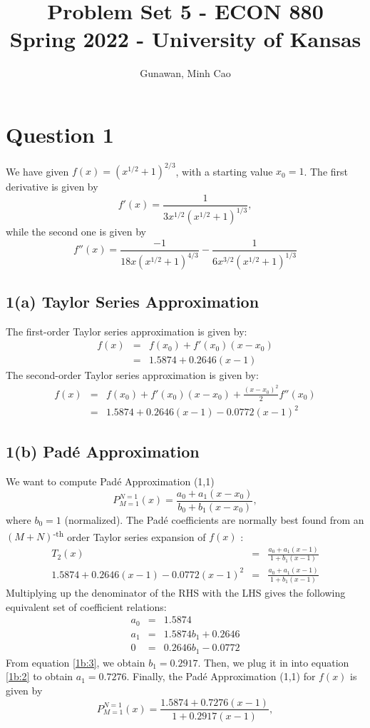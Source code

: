 \documentclass[11pt]{article}
\title{Problem Set 5 - ECON 880\\
	\small Spring 2022 - University of Kansas}
\author{Gunawan, Minh Cao}
\newcommand{\1}{\mathbbm{1}}
\begin{document}
\maketitle	
\section*{Question 1}
We have given $f(x) = (x^{1/2}+1)^{2/3}$, with a starting value $x_0=1$. The first derivative is given by
\[ f'(x) = \frac{1}{3x^{1/2}(x^{1/2} + 1)^{1/3}},\]
while the second one is given by
\[f''(x)= \frac{-1}{18x(x^{1/2} + 1)^{4/3}} - \frac{1}{6x^{3/2}(x^{1/2} + 1)^{1/3}}\]

\subsection*{1(a) Taylor Series Approximation }
The first-order Taylor series approximation is given by:
\begin{eqnarray*}
	f(x) &=& f(x_0)+f'(x_0)(x-x_0)\\
		 &=& 1.5874 + 0.2646 (x-1)
\end{eqnarray*}
The second-order Taylor series approximation is given by:
\begin{eqnarray*}
	f(x) &=& f(x_0)+f'(x_0)(x-x_0)+\frac{(x-x_0)^2}{2}f''(x_0)\\
	&=& 1.5874 + 0.2646 (x-1) -0.0772 (x-1)^2
\end{eqnarray*}
\subsection*{1(b) Pad\'{e} Approximation}
We want to compute Pad\'{e} Approximation (1,1) 
\[P_{M=1}^{N=1}(x) = \frac{a_0+a_1(x-x_0)}{b_0+b_1(x-x_0)},\]
where $b_0=1$ (normalized). 
The Pad\'{e} coefficients are normally best found from an $(M+N)$\textsuperscript{-th} order Taylor series expansion of $f(x)$ :
\begin{eqnarray*}
	T_2(x) &=& \frac{a_0+a_1(x-1)}{1+b_1(x-1)}\\
	1.5874 + 0.2646 (x-1) -0.0772 (x-1)^2 &=&  \frac{a_0+a_1(x-1)}{1+b_1(x-1)}
\end{eqnarray*}
Multiplying up the denominator of the RHS with the LHS gives the following equivalent set of coefficient relations:
\begin{eqnarray}
	a_0 &=& 1.5874 \label{1b:1}\\
	a_1 &=&  1.5874b_1 + 0.2646 \label{1b:2}\\
	0	&=& 0.2646b_1 -0.0772 \label{1b:3} 
\end{eqnarray}
From equation \ref{1b:3}, we obtain $b_1=0.2917$. Then, we plug it in into equation \ref{1b:2} to obtain $a_1=0.7276$. Finally, the Pad\'{e} Approximation (1,1) for $f(x)$ is given by
\[P_{M=1}^{N=1}(x) = \frac{1.5874+0.7276(x-1)}{1+0.2917(x-1)},\]
\end{document}
